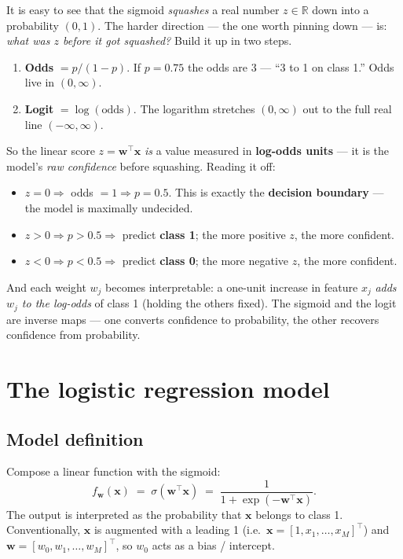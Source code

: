 \documentclass[11pt, a4paper]{article}
\begin{document}
\begin{notebox}[: what the raw real-number score $z = \mathbf{w}^\top\mathbf{x}$ actually means]
It is easy to see that the sigmoid \emph{squashes} a real number $z\in\mathbb{R}$ down into a probability $(0,1)$. The harder direction --- the one worth pinning down --- is: \emph{what was $z$ before it got squashed?} Build it up in two steps.
\begin{enumerate}
  \item \textbf{Odds} $= p/(1-p)$. If $p = 0.75$ the odds are $3$ --- ``3 to 1 on class 1.'' Odds live in $(0,\infty)$.
  \item \textbf{Logit} $= \log(\text{odds})$. The logarithm stretches $(0,\infty)$ out to the full real line $(-\infty,\infty)$.
\end{enumerate}
So the linear score $z = \mathbf{w}^\top\mathbf{x}$ \emph{is} a value measured in \textbf{log-odds units} --- it is the model's \emph{raw confidence} before squashing. Reading it off:
\begin{itemize}
  \item $z = 0 \Rightarrow$ odds $= 1 \Rightarrow p = 0.5$. This is exactly the \textbf{decision boundary} --- the model is maximally undecided.
  \item $z > 0 \Rightarrow p > 0.5 \Rightarrow$ predict \textbf{class 1}; the more positive $z$, the more confident.
  \item $z < 0 \Rightarrow p < 0.5 \Rightarrow$ predict \textbf{class 0}; the more negative $z$, the more confident.
\end{itemize}
And each weight $w_j$ becomes interpretable: a one-unit increase in feature $x_j$ \emph{adds $w_j$ to the log-odds} of class 1 (holding the others fixed). The sigmoid and the logit are inverse maps --- one converts confidence to probability, the other recovers confidence from probability.
\end{notebox}

\section{The logistic regression model}

\subsection{Model definition}

Compose a linear function with the sigmoid:
\[
f_\mathbf{w}(\mathbf{x}) \;=\; \sigma(\mathbf{w}^\top\mathbf{x}) \;=\; \frac{1}{1+\exp(-\mathbf{w}^\top\mathbf{x})}.
\]
The output is interpreted as the probability that $\mathbf{x}$ belongs to class 1. Conventionally, $\mathbf{x}$ is augmented with a leading 1 (i.e.\ $\mathbf{x} = [1, x_1, \ldots, x_M]^\top$) and $\mathbf{w} = [w_0, w_1, \ldots, w_M]^\top$, so $w_0$ acts as a bias / intercept.
\end{document}
